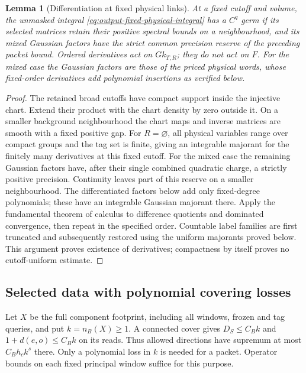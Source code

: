 \documentclass[11pt,reqno]{amsart}
\numberwithin{equation}{section}
\newtheorem{lemma}[theorem]{Lemma}
\theoremstyle{definition}
\theoremstyle{remark}
\begin{document}
\begin{lemma}[Differentiation at fixed physical links]
\label{lem:output-Borel-differentiation}
At a fixed cutoff and volume, the unmasked integral
\eqref{eq:output-fixed-physical-integral} has a \(C^q\) germ
if its selected matrices retain their positive spectral bounds
on a neighbourhood, and its mixed Gaussian factors have the
strict common precision reserve of the preceding packet bound.
Ordered derivatives act on \(Gk_{T,R}\); they do not act on
\(F\). For the mixed case the Gaussian factors are those of
the priced physical words, whose fixed-order derivatives add
polynomial insertions as verified below.
\end{lemma}
\begin{proof}
The retained broad cutoffs have compact support inside the
injective chart. Extend their product with the chart density
by zero outside it. On a smaller background neighbourhood the
chart maps and inverse matrices are smooth with a fixed
positive gap. For \(R=\varnothing\), all physical variables
range over compact groups and the tag set is finite, giving an
integrable majorant for the finitely many derivatives at this
fixed cutoff.
For the mixed case the remaining Gaussian factors have, after
their single combined quadratic charge, a strictly positive
precision. Continuity leaves part of this reserve on a smaller
neighbourhood. The differentiated factors below add only
fixed-degree polynomials; these have an integrable Gaussian
majorant there. Apply the fundamental theorem of calculus to
difference quotients and dominated convergence, then repeat
in the specified order. Countable label families are first
truncated and subsequently restored using the uniform
majorants proved below. This argument proves existence of
derivatives; compactness by itself proves no cutoff-uniform
estimate.
\end{proof}

\subsection{Selected data with polynomial covering losses}

Let \(X\) be the full component footprint, including all
windows, frozen and tag queries, and put \(k=n_B(X)\ge1\).
A connected cover gives
\(D_S\le C_Bk\) and \(1+d(e,o)\le C_Bk\) on its reads.
Thus allowed directions have supremum at most
\(C_Bh_ck^s\) there. Only a polynomial loss in \(k\) is
needed for a packet. Operator bounds on each fixed principal
window suffice for this purpose.
\end{document}
